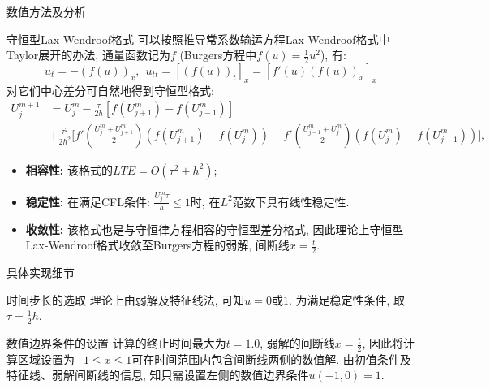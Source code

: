 \documentclass{article}
\begin{document}
\begin{section}{数值方法及分析}
\begin{subsection}{守恒型Lax-Wendroof格式}
        可以按照推导常系数输运方程Lax-Wendroof格式中Taylor展开的办法, 通量函数记为$f$ (Burgers方程中$f(u)=\frac{1}{2}u^2$), 有:
        $$u_t=-(f(u))_x,\ \ u_{tt} = [(f(u))_t]_x = [f'(u)(f(u))_x]_x$$
        对它们中心差分可自然地得到守恒型格式:
        \begin{align*}
            U_j^{m+1}&=U_j^m-\frac{\tau}{2h}[f(U_{j+1}^m) - f(U_{j-1}^m)] \\
                     &+ \frac{\tau^2}{2h^2}\bigg[f'(\frac{U_j^m+U_{j+1}^m}{2})(f(U_{j+1}^m)-f(U_j^m))-f'(\frac{U_{j-1}^m+U_{j}^m}{2})(f(U_{j}^m)-f(U_{j-1}^m)) \bigg],
        \end{align*}
        \begin{itemize}
            \item \textbf{相容性: }该格式的$LTE = O(\tau^2+h^2)$;
            \item \textbf{稳定性: }在满足CFL条件: $\frac{U_j^m\tau}{h}\leq 1$时, 在$L^2$范数下具有线性稳定性.
            \item \textbf{收敛性: }该格式也是与守恒律方程相容的守恒型差分格式, 因此理论上守恒型Lax-Wendroof格式收敛至Burgers方程的弱解, 间断线$x=\frac{t}{2}$.
        \end{itemize}
    \end{subsection}
\end{section}
\begin{section}{具体实现细节}
    \begin{subsection}{时间步长的选取}
        理论上由弱解及特征线法, 可知$u=0$或$1$. 为满足稳定性条件, 取$\tau=\frac{1}{2}h$.
    \end{subsection}
    \begin{subsection}{数值边界条件的设置}
        计算的终止时间最大为$t=1.0$, 弱解的间断线$x=\frac{t}{2}$, 因此将计算区域设置为$-1\leq x\leq 1$可在时间范围内包含间断线两侧的数值解. 由初值条件及特征线、弱解间断线的信息, 
        知只需设置左侧的数值边界条件$u(-1,0)=1$.
    \end{subsection}
\end{section}
\end{document}

